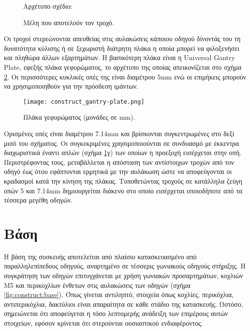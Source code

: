\begin{figure}
    \caption{Μέλη που αποτελούν τον τροχό.\label{fig:construct:wheel_exploded}}
    \begin{center}%
    \def\svgwidth{0.8\textwidth}
    
    \end{center}
    Αρχέτυπο σχέδιο:
\end{figure}

Οι τροχοί στερεώνονται απευθείας στις αυλακώσεις κάποιου οδηγού δίνοντάς του τη
δυνατότητα κύλισης ή σε ξεχωριστή διάτρητη πλάκα η οποία μπορεί να φιλοξενήσει
και πληθώρα άλλων εξαρτημάτων. Η βασικότερη πλάκα είναι η Universal Gantry
Plate, εφεξής πλάκα γεφυρώματος, το αρχέτυπο της οποίας απεικονίζεται στο σχήμα
\ref{fig:construct:gantry-plate}. Οι περισσότερες κυκλικές οπές της είναι
διαμέτρου 5mm ενώ οι επιμήκεις μπορούν να χρησιμοποιηθούν για την πρόσδεση
ιμάντων.

\begin{figure}
    \caption[Πλάκα γεφυρώματος]{Πλάκα γεφυρώματος (μονάδες σε mm).
    \label{fig:construct:gantry-plate}}
    \begin{center}%
    \texttt{[image: construct\_gantry-plate.png]}%
    \end{center}

\end{figure}

Ορισμένες οπές είναι διαμέτρου 7.14mm και βρίσκονται συγκεντρωμένες στο δεξί
μισό του σχήματος.
Οι συγκεκριμένες χρησιμοποιούνται σε συνδυασμό με έκκεντρα διαχωριστικά έναντι
απλών (σχήμα \ref{fig:construct:wheel_exploded}γ) των οποίων η προεξοχή
εισέρχεται στην οπή. Περιστρέφοντας τους, μεταβάλλεται η απόσταση των
αντίστοιχων τροχών από τον οδηγό έως ότου εφάπτονται ερμητικά με την αυλάκωση
ώστε να αποφεύγονται οι κραδασμοί κατά την κίνηση της πλάκας.
Τοποθετώντας τροχούς σε κατάλληλα ζεύγη οπών 5 και 7.14mm δημιουργείται διάκενο
στο οποίο εισέρχεται οποιοδήποτε από τα τέσσερα μεγέθη οδηγών.




\section{Βάση}

\label{sec:construct:base}
Η βάση της συσκευής αποτελείται από πλαίσιο κατασκευασμένο από παραλληλεπίπεδους
οδηγούς, αναρτημένο σε τέσσερις γωνιακούς οδηγούς στήριξης. Η συγκράτηση των
οδηγών επιτυγχάνεται με χρήση γωνιακών προσαρτημάτων, κοχλιών M5 και περικοχλίων
ένθετων στις αυλακώσεις των οδηγών (σχήμα \ref{fig:construct:base}). Όπως
γίνεται αντιληπτό, στοιχεία όπως κοχλίες, περικόχλια, αντιπερικόχλια, δακτύλιοι
 είναι απαραίτητα σε κάθε στάδιο της κατασκευής. Ωστόσο, σημειώνεται ότι
αποφεύγεται η τόσο λεπτομερής ανάδειξη των επιμέρους αυτών στοιχείων, εφόσον
κρίνεται ότι στερούνται ουσιαστικού ενδιαφέροντος.

